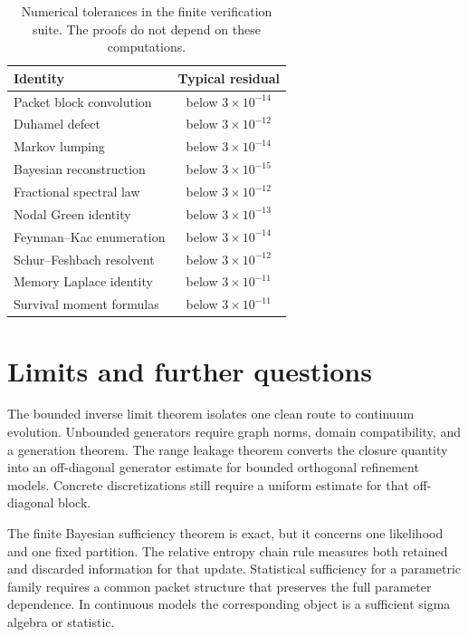 \documentclass[11pt,letterpaper]{article}
\theoremstyle{plain}
\theoremstyle{plain}
\theoremstyle{plain}
\theoremstyle{definition}
\theoremstyle{definition}
\theoremstyle{definition}
\theoremstyle{definition}
\theoremstyle{definition}
\theoremstyle{remark}
\theoremstyle{remark}
\theoremstyle{remark}
\theoremstyle{remark}
\theoremstyle{remark}
\theoremstyle{remark}
\begin{document}
\begin{table}[t]
\centering
\begin{tabular}{lc}
\toprule
Identity & Typical residual \\
\midrule
Packet block convolution & below \(3\times10^{-14}\) \\
Duhamel defect & below \(3\times10^{-12}\) \\
Markov lumping & below \(3\times10^{-14}\) \\
Bayesian reconstruction & below \(3\times10^{-15}\) \\
Fractional spectral law & below \(3\times10^{-12}\) \\
Nodal Green identity & below \(3\times10^{-13}\) \\
Feynman--Kac enumeration & below \(3\times10^{-14}\) \\
Schur--Feshbach resolvent & below \(3\times10^{-12}\) \\
Memory Laplace identity & below \(3\times10^{-11}\) \\
Survival moment formulas & below \(3\times10^{-11}\) \\
\bottomrule
\end{tabular}
\caption{Numerical tolerances in the finite verification suite. The proofs do not depend on these computations.}
\label{extended:tab:verification_tolerances}
\end{table}

\FloatBarrier
\section{Limits and further questions}\label{extended:section:18}\label{extended:sec:limits}

The bounded inverse limit theorem isolates one clean route to continuum evolution. Unbounded generators require graph norms, domain compatibility, and a generation theorem. The range leakage theorem converts the closure quantity into an off-diagonal generator estimate for bounded orthogonal refinement models. Concrete discretizations still require a uniform estimate for that off-diagonal block.

The finite Bayesian sufficiency theorem is exact, but it concerns one likelihood and one fixed partition. The relative entropy chain rule measures both retained and discarded information for that update. Statistical sufficiency for a parametric family requires a common packet structure that preserves the full parameter dependence. In continuous models the corresponding object is a sufficient sigma algebra or statistic.
\end{document}
